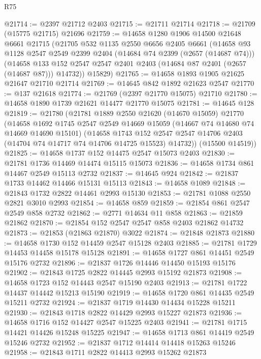 \begin{lexlean}{R75}
\begin{coremodule}
@21714 := @2397 @21712 @2403
@21715 := @21711 @21714
@21718 := @21709 (@15775 @21715) @21696
@21759 := @14658
    @1280
    @1906
    @14500
    @21648
    @6661
    @21715
    (@21705
      @532
      @1135
      @2550
      @6656
      @2405
      @6661
      (@14658
        @93
        @1128
        @2547
        @2549
        @2399
        @2404
        (@14684 @74 @2399 (@2657 (@14687 @74)))
        (@14658 @133 @152 @2547 @2547 @2401 @2403 (@14684 @87 @2401 (@2657 (@14687 @87))) @14732))
      @15829)
@21765 := @14658 @1893 @1905 @21625 @21647 @21710 @21714
@21769 := @14645 @842 @1892 @21623 @2547
@21770 := @137 @21618
@21774 := @21769 (@2397 @21770 @15075) @21710
@21780 := @14658 @1890 @1739 @21621 @14477 @21770 @15075
@21781 := @14645 @128
@21819 := @21780
    (@21781
      @1889
      @2550
      @21620
      (@14670 @15059)
      @21770
      (@14658
        @1692
        @1745
        @2547
        @2549
        @14669
        @15059
        (@14667 @74 @14680 @74 @14669 @14690 @15101)
        (@14658
          @1743
          @152
          @2547
          @2547
          @14706
          @2403
          (@14704 @74 @14717 @74 @14706 @14725 @15523)
          @14732))
      (@15500 @14519))
@21825 := @14658 @1737 @152 @14475 @2547 @15073 @2403
@21830 := @21781 @1736 @14469 @14474 @15115 @15073
@21836 := @14658 @1734 @861 @14467 @2549 @15113 @2732
@21837 := @14645 @924
@21842 := @21837 @1733 @14462 @14466 @15131 @15113
@21843 := @14658 @1089
@21848 := @21843 @1732 @2822 @14461 @2993 @15130
@21853 := @21781 @1088 @2550 @2821 @3010 @2993
@21854 := @14658 @859
@21859 := @21854 @861 @2547 @2549 @858 @2732
@21862 := @2771 @14634 @11 @858
@21863 := @21859 @21862
@21870 := @21854 @152 @2547 @2547 @858 @2403 @21862 @14732
@21873 := @21853 (@21863 @21870) @3022
@21874 := @21848 @21873
@21880 := @14658 @1730 @152 @14459 @2547 @15128 @2403
@21885 := @21781 @1729 @14453 @14458 @15178 @15128
@21891 := @14658 @1727 @861 @14451 @2549 @15176 @2732
@21896 := @21837 @1726 @14446 @14450 @15193 @15176
@21902 := @21843 @1725 @2822 @14445 @2993 @15192 @21873
@21908 := @14658 @1723 @152 @14443 @2547 @15190 @2403
@21913 := @21781 @1722 @14437 @14442 @15213 @15190
@21919 := @14658 @1720 @861 @14435 @2549 @15211 @2732
@21924 := @21837 @1719 @14430 @14434 @15228 @15211
@21930 := @21843 @1718 @2822 @14429 @2993 @15227 @21873
@21936 := @14658 @1716 @152 @14427 @2547 @15225 @2403
@21941 := @21781 @1715 @14421 @14426 @15248 @15225
@21947 := @14658 @1713 @861 @14419 @2549 @15246 @2732
@21952 := @21837 @1712 @14414 @14418 @15263 @15246
@21958 := @21843 @1711 @2822 @14413 @2993 @15262 @21873

\end{coremodule}
\end{lexlean}
